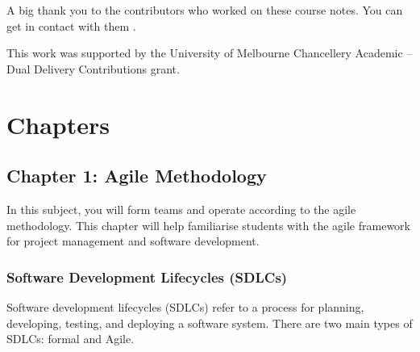 \documentclass[letterpaper,10pt,english]{jupyterBook}
\begin{document}
\begin{DUlineblock}{0em}
\item[] 
\end{DUlineblock}

\sphinxAtStartPar
A big thank you to the contributors who worked on these course notes. You can get in contact with them
.

\sphinxAtStartPar
This work was supported by the University of Melbourne Chancellery Academic – Dual Delivery Contributions grant.


\part{Chapters}


\chapter{Chapter 1: Agile Methodology}
\label{\detokenize{chapter_1/agile_methodology:chapter-1-agile-methodology}}\label{\detokenize{chapter_1/agile_methodology::doc}}
\sphinxAtStartPar
In this subject, you will form teams and operate according to the agile
methodology. This chapter will help familiarise students with the agile
framework for project management and software development.


\section{Software Development Lifecycles (SDLCs)}
\label{\detokenize{chapter_1/agile_methodology:software-development-lifecycles-sdlcs}}
\sphinxAtStartPar
Software development lifecycles (SDLCs) refer to a process for planning,
developing, testing, and deploying a software system. There are two main
types of SDLCs: formal and Agile.
\end{document}
